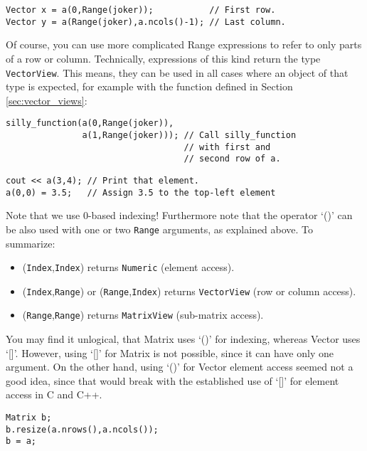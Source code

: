 \begin{verbatim}
Vector x = a(0,Range(joker));           // First row.
Vector y = a(Range(joker),a.ncols()-1); // Last column.
\end{verbatim}

Of course, you can use more complicated Range expressions to refer to
only parts of a row or column. Technically, expressions of this kind
return the type \verb|VectorView|. This means, they can be used
in all cases where an object of that type is expected, for example
with the function defined in Section \ref{sec:vector_views}:

\begin{verbatim}
silly_function(a(0,Range(joker)),
               a(1,Range(joker))); // Call silly_function 
                                   // with first and 
                                   // second row of a.
\end{verbatim}

\begin{verbatim}
cout << a(3,4); // Print that element.
a(0,0) = 3.5;   // Assign 3.5 to the top-left element
\end{verbatim}

Note that we use 0-based indexing! Furthermore note that the operator
`()' can be also used with one or two \verb|Range| arguments, as
explained above. To summarize:

\begin{itemize}
\item (\verb|Index|,\verb|Index|) returns \verb|Numeric| (element access).
\item (\verb|Index|,\verb|Range|) or (\verb|Range|,\verb|Index|) returns
  \verb|VectorView| (row or column access).
\item (\verb|Range|,\verb|Range|) returns \verb|MatrixView|
  (sub-matrix access).
\end{itemize}

You may find it unlogical, that Matrix uses `()' for indexing, whereas
Vector uses `[]'. However, using `[]' for Matrix is not possible,
since it can have only one argument. On the other hand, using `()' for
Vector element access seemed not a good idea, since that would break
with the established use of `[]' for element access in C and C++.

\begin{verbatim}
Matrix b;
b.resize(a.nrows(),a.ncols());
b = a;
\end{verbatim}

